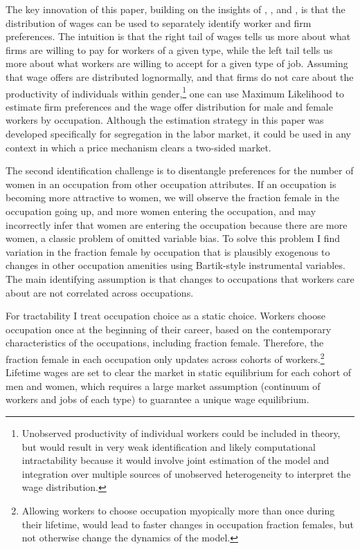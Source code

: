 \documentclass[12pt]{article}
\begin{document}
The key innovation of this paper, building on the insights of , , and , is that the distribution of wages can be used to separately identify worker and firm preferences. The intuition is that the right tail of wages tells us more about what firms are willing to pay for workers of a given type, while the left tail tells us more about what workers are willing to accept for a given type of job. Assuming that wage offers are distributed lognormally, and that firms do not care about the productivity of individuals within gender,\footnote{Unobserved productivity of individual workers could be included in theory, but would result in very weak identification and likely computational intractability because it would involve joint estimation of the model and integration over multiple sources of unobserved heterogeneity to interpret the wage distribution.} one can use Maximum Likelihood to estimate firm preferences and the wage offer distribution for male and female workers by occupation. Although the estimation strategy in this paper was developed specifically for segregation in the labor market, it could be used in any context in which a price mechanism clears a two-sided market.

The second identification challenge is to disentangle preferences for the number of women in an occupation from other occupation attributes. If an occupation is becoming more attractive to women, we will observe the fraction female in the occupation going up, and more women entering the occupation, and may incorrectly infer that women are entering the occupation because there are more women, a classic problem of omitted variable bias. To solve this problem I find variation in the fraction female by occupation that is plausibly exogenous to changes in other occupation amenities using Bartik-style instrumental variables. The main identifying assumption is that changes to occupations that workers care about are not correlated across occupations.

For tractability I treat occupation choice as a static choice. Workers choose occupation once at the beginning of their career, based on the contemporary characteristics of the occupations, including fraction female. Therefore, the fraction female in each occupation only updates across cohorts of workers.\footnote{Allowing workers to choose occupation myopically more than once during their lifetime, would lead to faster changes in occupation fraction females, but not otherwise change the dynamics of the model.} Lifetime wages are set to clear the market in static equilibrium for each cohort of men and women, which requires a large market assumption (continuum of workers and jobs of each type) to guarantee a unique wage equilibrium.
\end{document}
